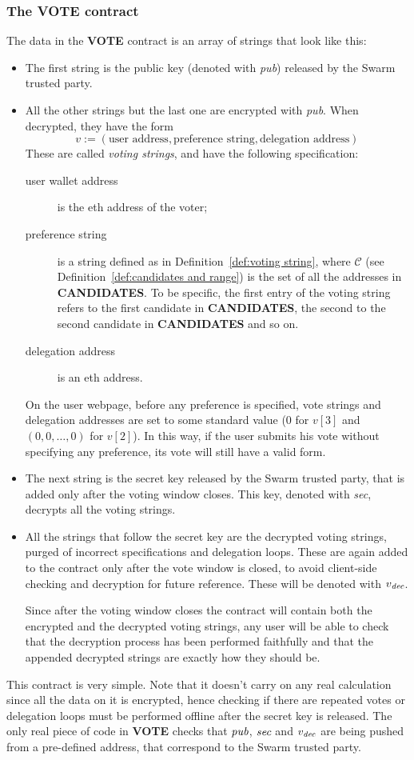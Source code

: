 \documentclass[submission, copyright,creativecommons,sharealike,noncommercial]{eptcs}
\newcommand{\candidates}{\ensuremath{\mathcal{C}} \xspace}
\newcommand{\Candidates}{\textbf{CANDIDATES}\xspace}
\newcommand{\Vote}{\textbf{VOTE}\xspace}
\begin{document}
\subsubsection{The \Vote contract}
	The data in the \Vote contract is an array of strings that look like this:
	\begin{itemize}
		\item The first string is the public key (denoted with \emph{pub}) released by the Swarm trusted party.
		\item All the other strings but the last one are encrypted with \emph{pub}. When decrypted, they have the form
		\[
		v := (\text{user address}, \text{preference string}, \text{delegation address})
		\]
		These are called \emph{voting strings}, and have the following specification:
		\begin{description}
			\item[user wallet address] is the eth address of the voter;
			\item[preference string] is a string defined as in Definition~\ref{def:voting string}, where $\candidates$ (see Definition~\ref{def:candidates and range}) is the set of all the addresses in \Candidates. To be specific, the first entry of the voting string refers to the first candidate in \Candidates, the second to the second candidate in \Candidates and so on.
			\item[delegation address] is an eth address.
		\end{description}
		On the user webpage, before any preference is specified, vote strings and delegation addresses are set to some standard value ($0$ for $v[3]$ and $(0,0, \dots, 0)$ for $v[2]$). In this way, if the user submits his vote without specifying any preference, its vote will still have a valid form.
		\item The next string is the secret key released by the Swarm trusted party, that is added only after the voting window closes. This key, denoted with \emph{sec}, decrypts all the voting strings.
		\item All the strings that follow the secret key are the decrypted voting strings, purged of incorrect specifications and delegation loops. These are again added to the contract only after the vote window is closed, to avoid client-side checking and decryption for future reference. These will be denoted with $v_{\emph{dec}}$. 
		
		Since after the voting window closes the contract will contain both the encrypted and the decrypted voting strings, any user will be able to check that the decryption process has been performed faithfully and that the appended decrypted strings are exactly how they should be.
		
	\end{itemize}
	This contract is very simple. Note that it doesn't carry on any real calculation since all the data on it is encrypted, hence checking if there are repeated votes or delegation loops must be performed offline after the secret key is released. The only real piece of code in \Vote checks that $\emph{pub}$, $\emph{sec}$ and $v_{\emph{dec}}$ are being pushed from a pre-defined address, that correspond to the Swarm trusted party.
%
%
\end{document}
